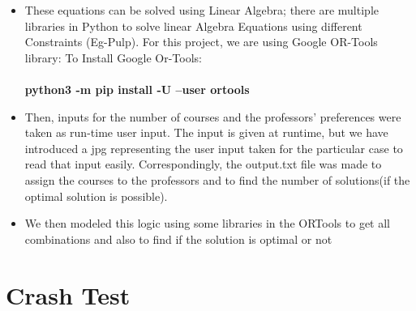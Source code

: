 \documentclass{article}
\begin{document}
\begin{itemize}
  \item These equations can be solved using Linear Algebra; there are multiple libraries in Python to solve linear Algebra Equations using different Constraints (Eg-Pulp). For this project, we are using Google OR-Tools library:
  To Install Google Or-Tools:\\\\
   \hspace{1cm}
    \textbf{python3 -m pip install -U --user ortools}
\\

  
\item Then, inputs for the number of courses and the professors' preferences were taken as run-time user input. The input is given at runtime, but we have introduced a jpg representing the user input taken for the particular case to read that input easily. Correspondingly, the output.txt file was made to assign the courses to the professors and to find the number of solutions(if the optimal solution is possible).

\item We then modeled this logic using some libraries in the ORTools to get all combinations and also to find if the solution is optimal or not


\end{itemize}







\section{Crash Test}
\end{document}
